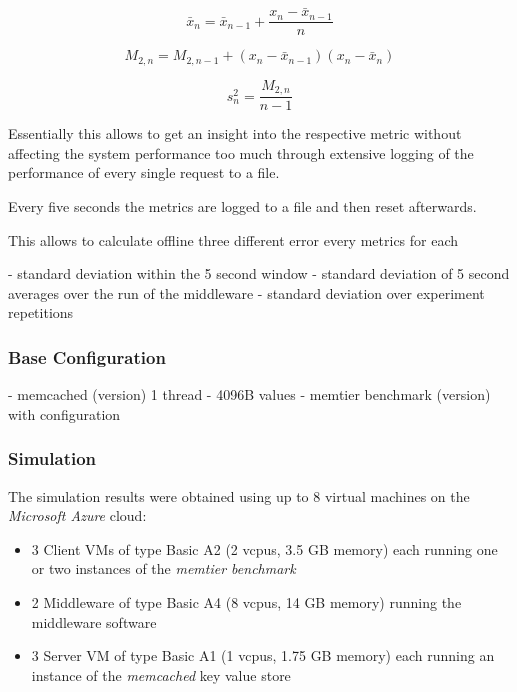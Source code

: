 \documentclass[report.tex]{subfiles}
\begin{document}
\begin{equation}
	\bar{x}_n = \bar{x}_{n-1} + \frac{x_n -\bar{x}_{n-1}}{n}
\end{equation}

\begin{equation}
	M_{2,n} = M_{2,n-1} + (x_n - \bar{x}_{n-1})(x_n - \bar{x}_n)
\end{equation}

\begin{equation}
	s^2_n = \frac{M_{2,n}}{n-1}
\end{equation}

Essentially this allows to get an insight into the respective metric without affecting the system performance too much through extensive logging of the performance of every single request to a file. 

Every five seconds the metrics are logged to a file and then reset afterwards.

This allows to calculate offline three different error every metrics for each 

- standard deviation within the 5 second window
- standard deviation of 5 second averages over the run of the middleware
- standard deviation over experiment repetitions 



\subsubsection{Base Configuration}
- memcached (version) 1 thread
- 4096B values
- memtier benchmark (version) with configuration
\subsubsection{Simulation}\label{simulation}

The simulation results were obtained using up to 8 virtual machines on the \emph{Microsoft Azure} cloud:
\begin{itemize}
	\item 3 Client VMs of type Basic A2 (2 vcpus, 3.5 GB memory) each running one or two instances of the \emph{memtier benchmark}
	\item 2 Middleware of type Basic A4 (8 vcpus, 14 GB memory) running the middleware software
	\item 3 Server VM of type Basic A1 (1 vcpus, 1.75 GB memory) each running an instance of the \emph{memcached} key value store
\end{itemize}
\end{document}
